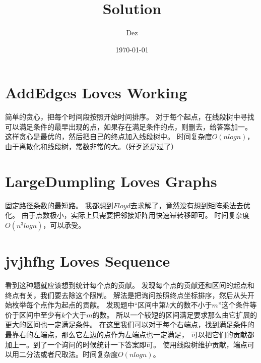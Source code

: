 \documentclass{article}
\title{Solution}
\author{Dez}
\date{\today}
\begin{document}
\maketitle

\section{AddEdges Loves Working}
简单的贪心，把每个时间段按照开始时间排序。
对于每个起点，在线段树中寻找可以满足条件的最早出现的点，如果存在满足条件的点，则删去，给答案加一。
这样贪心是最优的，然后把自己的终点加入线段树中。
时间复杂度$O(nlogn)$，由于离散化和线段树，常数非常的大。（好歹还是过了）

\section{LargeDumpling Loves Graphs}
固定路径条数的最短路。
我都想到$Floyd$去求解了，竟然没有想到矩阵乘法去优化。
由于点数极小，实际上只需要把邻接矩阵用快速幂转移即可。
时间复杂度$O(n^3logn)$，可以承受。

\section{jvjhfhg Loves Sequence}
看到这种题就应该想到统计每个点的贡献。
发现每个点的贡献还和区间的起点和终点有关，我们要去除这个限制。
解法是把询问按照终点坐标排序，然后从头开始枚举每个点作为起点的贡献。
发现题中“区间中第$k$大的数不小于$m$”这个条件等价于区间中至少有$k$个大于$m$的数。
所以一个较短的区间满足要求那么由它扩展的更大的区间也一定满足条件。
在这里我们可以对于每个右端点，找到满足条件的最靠右的左端点，那么它左边的点作为左端点也一定满足，
可以把它们的贡献都加上一。到了一个询问的时候统计一下答案即可。
使用线段树维护贡献，端点可以用二分法或者尺取法。时间复杂度$O(nlogn)$。
\end{document}
